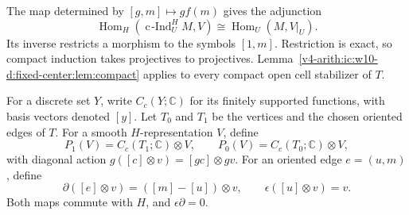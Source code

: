 The map determined by $[g,m]\mapsto g f(m)$ gives the adjunction
\[
 \operatorname{Hom}_H(\operatorname{c\!\operatorname{-}Ind}_U^H M,V)\cong\operatorname{Hom}_U(M,V|_U).
\]
Its inverse restricts a morphism to the symbols $[1,m]$.
Restriction is exact, so compact induction takes projectives to projectives.
Lemma~\ref{v4-arith:ic:w10-d:fixed-center:lem:compact} applies to every compact open cell stabilizer of $T$.

For a discrete set $Y$, write $C_c(Y;\mathbb C)$ for its finitely supported functions,
with basis vectors denoted $[y]$.
Let $T_0$ and $T_1$ be the vertices and the chosen oriented edges of $T$.
For a smooth $H$-representation $V$, define
\[
 P_1(V)=C_c(T_1;\mathbb C)\otimes V,\qquad
 P_0(V)=C_c(T_0;\mathbb C)\otimes V,
\]
with diagonal action $g([c]\otimes v)=[gc]\otimes gv$.
For an oriented edge $e=(u,m)$, define
\[
 \partial([e]\otimes v)=([m]-[u])\otimes v,
 \qquad \epsilon([u]\otimes v)=v.
\]
Both maps commute with $H$, and $\epsilon\partial=0$.


